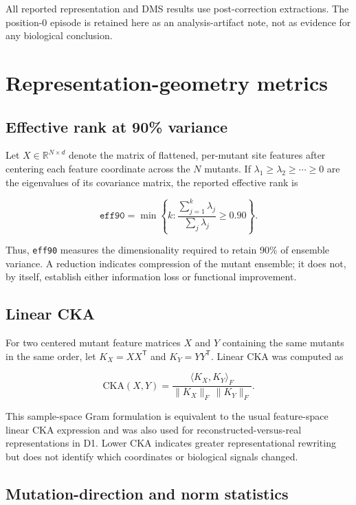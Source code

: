 \documentclass[10pt,a4paper]{article}
\begin{document}
All reported representation and DMS results use post-correction extractions. The position-0 episode is retained here as an analysis-artifact note, not as evidence for any biological conclusion.

\section{Representation-geometry metrics}

\subsection{Effective rank at 90\% variance}

Let $X\in\mathbb{R}^{N\times d}$ denote the matrix of flattened, per-mutant site features after centering each feature coordinate across the $N$ mutants. If $\lambda_1\geq\lambda_2\geq\cdots\geq0$ are the eigenvalues of its covariance matrix, the reported effective rank is

\begin{equation}
\texttt{eff90}=\min\left\{k:\frac{\sum_{j=1}^{k}\lambda_j}{\sum_{j}\lambda_j}\geq0.90\right\}.
\end{equation}

Thus, \texttt{eff90} measures the dimensionality required to retain 90\% of ensemble variance. A reduction indicates compression of the mutant ensemble; it does not, by itself, establish either information loss or functional improvement.

\subsection{Linear CKA}

For two centered mutant feature matrices $X$ and $Y$ containing the same mutants in the same order, let $K_X=XX^{\mathsf T}$ and $K_Y=YY^{\mathsf T}$. Linear CKA was computed as

\begin{equation}
\mathrm{CKA}(X,Y)=
\frac{\langle K_X,K_Y\rangle_F}
{\lVert K_X\rVert_F\,\lVert K_Y\rVert_F}.
\end{equation}

This sample-space Gram formulation is equivalent to the usual feature-space linear CKA expression and was also used for reconstructed-versus-real representations in D1. Lower CKA indicates greater representational rewriting but does not identify which coordinates or biological signals changed.

\subsection{Mutation-direction and norm statistics}
\end{document}

